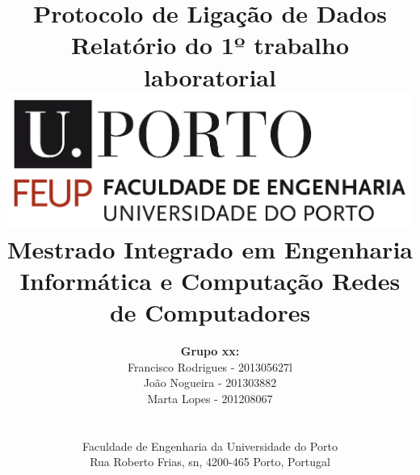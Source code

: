 \documentclass[11pt]{article}
\begin{document}
\setlength{\textwidth}{16cm}
\setlength{\textheight}{22cm}

\title{\Huge\textbf{Protocolo de Ligação de Dados}\linebreak\linebreak\linebreak
\Large\textbf{Relatório do 1º trabalho laboratorial}\linebreak
\linebreak\linebreak
\includegraphics[scale=0.1]{feup-logo.png}\linebreak
\linebreak\linebreak
\Large{Mestrado Integrado em Engenharia Informática e Computação} \linebreak\linebreak
\Large{Redes de Computadores}
}

\author{\textbf{Grupo xx:}\\
Francisco Rodrigues - 201305627l\\
João Nogueira - 201303882 \\
Marta Lopes - 201208067 \\
\linebreak\linebreak \\
 \\ Faculdade de Engenharia da Universidade do Porto \\ Rua Roberto Frias, s\/n, 4200-465 Porto, Portugal \linebreak\linebreak\linebreak
\linebreak\linebreak\vspace{1cm}}

\maketitle
\thispagestyle{empty}
\end{document}
